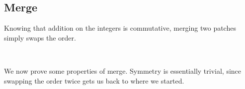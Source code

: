 \subsection{Merge}

Knowing that addition on the integers is commutative, merging two patches simply swaps
the order.

\begin{code}%
\>[0]\AgdaSpace{}%
\AgdaSymbol{:}\AgdaSpace{}%
\AgdaSymbol{(}\AgdaSpace{}%
\AgdaSpace{}%
\AgdaSymbol{)}\AgdaSpace{}%
\AgdaSpace{}%
\AgdaSymbol{(}\AgdaSpace{}%
\AgdaSpace{}%
\AgdaSymbol{)}\<%
\\
\>[0]\AgdaSpace{}%
\AgdaSymbol{(}\AgdaSpace{}%
\AgdaOperator{\AgdaInductiveConstructor{,}}\AgdaSpace{}%
\AgdaSymbol{)}\AgdaSpace{}%
\AgdaSymbol{=}\AgdaSpace{}%
\AgdaSymbol{(}\AgdaSpace{}%
\AgdaOperator{\AgdaInductiveConstructor{,}}\AgdaSpace{}%
\AgdaSymbol{)}\<%
\end{code}

We now prove some properties of merge. Symmetry is essentially trivial, since swapping
the order twice gets us back to where we started.

\begin{code}%
\>[0]\AgdaSpace{}%
\AgdaSymbol{:}%
\>[86I]\AgdaSymbol{\{}\AgdaSpace{}%
\AgdaSpace{}%
\AgdaSpace{}%
\AgdaSpace{}%
\AgdaSpace{}%
\AgdaSymbol{:}\AgdaSpace{}%
\AgdaSpace{}%
\AgdaSymbol{\}}\<%
\\
\>[.][@{}l@{}]\<[86I]%
\>[12]\AgdaSpace{}%
\AgdaSpace{}%
\AgdaSymbol{(}\AgdaSpace{}%
\AgdaSpace{}%
\AgdaOperator{\AgdaInductiveConstructor{,}}\AgdaSpace{}%
\AgdaSpace{}%
\AgdaSymbol{)}\AgdaSpace{}%
\AgdaSpace{}%
\AgdaSymbol{(}\AgdaSpace{}%
\AgdaSpace{}%
\AgdaOperator{\AgdaInductiveConstructor{,}}\AgdaSpace{}%
\AgdaSpace{}%
\AgdaSymbol{)}\AgdaSpace{}%
\AgdaSpace{}%
\AgdaSpace{}%
\AgdaSymbol{(}\AgdaSpace{}%
\AgdaSpace{}%
\AgdaOperator{\AgdaInductiveConstructor{,}}\AgdaSpace{}%
\AgdaSpace{}%
\AgdaSymbol{)}\AgdaSpace{}%
\AgdaSpace{}%
\AgdaSymbol{(}\AgdaSpace{}%
\AgdaSpace{}%
\AgdaOperator{\AgdaInductiveConstructor{,}}\AgdaSpace{}%
\AgdaSpace{}%
\AgdaSymbol{)}\<%
\\
\>[0]\AgdaSpace{}%
\AgdaSpace{}%
\AgdaSymbol{=}\AgdaSpace{}%
\AgdaSpace{}%
\AgdaSpace{}%
\<%
\end{code}

